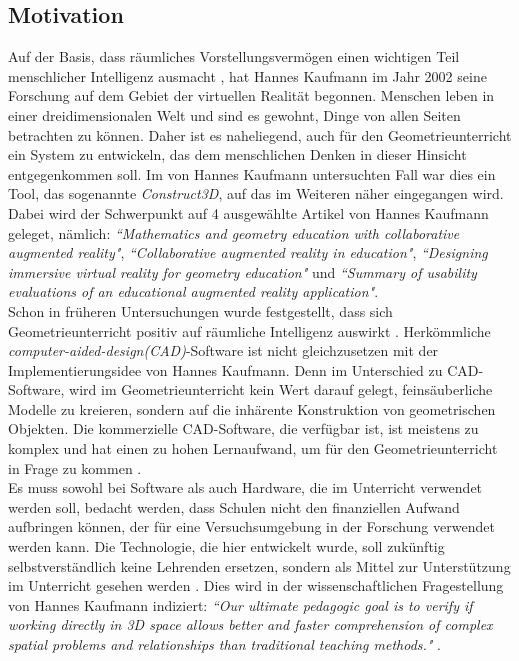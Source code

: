 \documentclass[deutsch]{llncs}
\begin{document}
\subsection{Motivation}
Auf der Basis, dass räumliches Vorstellungsvermögen einen wichtigen Teil menschlicher Intelligenz ausmacht \cite{spatial}, hat Hannes Kaufmann im Jahr 2002 seine Forschung auf dem Gebiet der virtuellen Realität begonnen.
Menschen leben in einer dreidimensionalen Welt und sind es gewohnt, Dinge von allen Seiten betrachten zu können. Daher ist es naheliegend, auch für den Geometrieunterricht ein System zu entwickeln,
das dem menschlichen Denken in dieser Hinsicht entgegenkommen soll. Im von Hannes Kaufmann untersuchten Fall war dies ein Tool, das sogenannte \emph{Construct3D}, auf das im Weiteren näher eingegangen wird. Dabei wird der Schwerpunkt auf 4 ausgewählte Artikel von Hannes Kaufmann geleget, nämlich:  \emph{``Mathematics and geometry education with collaborative augmented reality"}\cite{Kaufmann:2002:MGE:1242073.1242086}, \emph{``Collaborative augmented reality in education"}\cite{article}, \emph{``Designing immersive virtual reality for geometry education"} \cite{1667626} und \emph{``Summary of usability evaluations of an educational augmented reality application"}\cite{Kaufmann_summaryof}. \\

 Schon in früheren Untersuchungen wurde festgestellt, dass sich Geometrieunterricht positiv auf räumliche Intelligenz auswirkt \cite{GittlerDifferentialTO}.
Herkömmliche  \emph{computer-aided-design(CAD)}-Software  ist nicht gleichzusetzen mit der Implementierungsidee von Hannes Kaufmann. Denn im Unterschied zu CAD-Software, wird im Geometrieunterricht kein Wert darauf gelegt, feinsäuberliche Modelle zu kreieren, sondern auf die inhärente Konstruktion von geometrischen Objekten. Die kommerzielle CAD-Software, die verfügbar ist, ist meistens zu komplex und hat einen zu hohen Lernaufwand, um für den Geometrieunterricht in Frage zu kommen  \cite{Kaufmann:2002:MGE:1242073.1242086}. \\
Es muss sowohl bei Software als auch Hardware, die im Unterricht verwendet werden soll, bedacht werden, dass Schulen nicht den finanziellen Aufwand aufbringen können, der für eine Versuchsumgebung in der Forschung verwendet werden kann.  Die Technologie, die hier entwickelt wurde, soll zukünftig selbstverständlich keine Lehrenden ersetzen, sondern als Mittel zur Unterstützung im Unterricht gesehen werden \cite{article}. Dies wird in der wissenschaftlichen Fragestellung von Hannes Kaufmann indiziert: \emph{``Our ultimate pedagogic goal is to verify if working directly in 3D space allows better and faster comprehension of complex spatial problems and relationships than traditional teaching methods."} \cite{1667626}. \\
\end{document}
